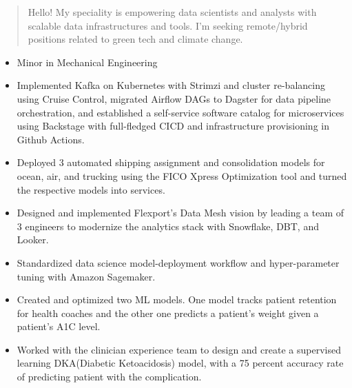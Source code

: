 \documentclass[10pt,a4paper,ragged2e,withhyper]{altacv}
\begin{document}
\begin{paracol}{2}
            \begin{quote}
            Hello! My speciality is empowering data scientists and analysts with scalable data infrastructures and tools. I'm seeking remote/hybrid positions related to green tech and climate change.
            \end{quote}
            \begin{itemize}
                \item Minor in Mechanical Engineering
            \end{itemize}
            \begin{itemize}
                \item Implemented Kafka on Kubernetes with Strimzi and cluster re-balancing using Cruise Control, migrated Airflow DAGs to Dagster for data pipeline orchestration, and established a self-service software catalog for microservices using Backstage with full-fledged CICD and infrastructure provisioning in Github Actions.
                \item Deployed 3 automated shipping assignment and consolidation models for ocean, air, and trucking using the FICO Xpress Optimization tool and turned the respective models into services.
                \item Designed and implemented Flexport's Data Mesh vision by leading a team of 3 engineers to modernize the analytics stack with Snowflake, DBT, and Looker.
            \end{itemize}
            \divider
            
            \begin{itemize}
                \item Standardized data science model-deployment workflow and hyper-parameter tuning with Amazon Sagemaker.
                \item Created and optimized two ML models. One model tracks patient retention for health coaches and the other one predicts a patient’s weight given a patient’s A1C level.
                \item Worked with the clinician experience team to design and create a supervised learning DKA(Diabetic Ketoacidosis) model, with a 75 percent accuracy rate of predicting patient with the complication.
            \end{itemize}
    \end{paracol}
\end{document}
